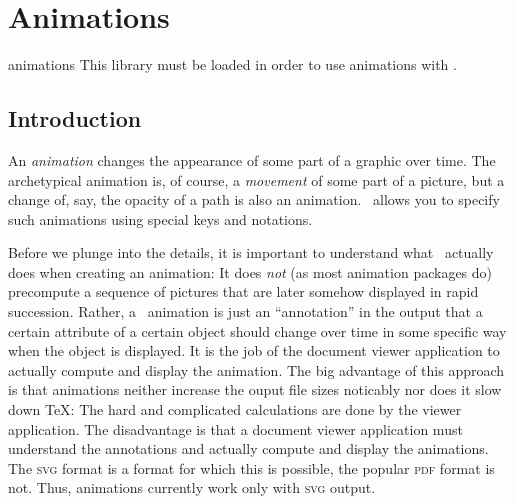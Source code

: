 %
%
%


\section{Animations}
\label{section-tikz-animations}


\begin{tikzlibrary}{animations}
  This library must be loaded in order to use animations with \tikzname.
\end{tikzlibrary}


\subsection{Introduction}

An \emph{animation} changes the appearance of some part of a graphic
over time. The archetypical animation is, of course, a \emph{movement} 
of some part of a picture, but a change of, say, the opacity of a path
is also an animation. \tikzname\ allows you to specify such animations
using special keys and notations.

\begin{codeexample}[width=8.5cm]
\end{codeexample}

Before we plunge into the details, it is important to understand what
\tikzname\ actually does when creating an animation: It does
\emph{not} (as most animation packages do) precompute a sequence of
pictures that are later somehow displayed in rapid succession. Rather, a
\tikzname\ animation is just an ``annotation'' in the output that a
certain attribute of a certain object should change over time in some
specific way when the object is displayed. It is the job of the
document viewer application to actually compute and display the
animation. The big advantage of this approach is that animations neither
increase the ouput file sizes noticably nor does it slow down
\TeX: The hard and complicated calculations are done by the viewer
application. The disadvantage is that a document viewer application
must understand the annotations and actually compute and display the
animations. The \textsc{svg} format is a format for which this is
possible, the popular \textsc{pdf} format is not. Thus, animations
currently work only with \textsc{svg} output.


